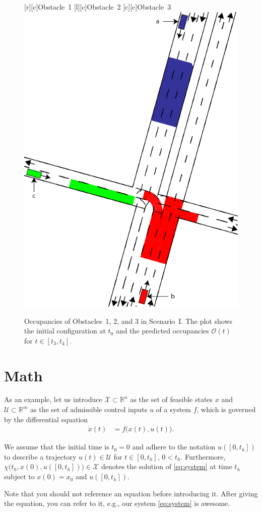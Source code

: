 \begin{figure}[!htpb]
	\centering
	\footnotesize
	[c]{Obstacle~1}
	[c]{Obstacle~2}
	[c]{Obstacle~3}
	\includegraphics[width=0.4\columnwidth]{./figures/Scenario_Intersection_Occ_1,5-2,0s_final}
	\caption{Occupancies of Obstacles~1, 2, and 3 in Scenario~I.
		The plot shows the initial configuration at $t_{0}$ and the predicted occupancies $\mathcal{O}(t)$ for ${t \in [t_{3}, t_{4}]}$.
	}
	\label{fig:scenario1}
\end{figure}

\section{Math}
As an example, let us introduce $\mathcal{X}\subset\mathbb{R}^n$ as the set of feasible states $x$ and $\mathcal{U}\subset\mathbb{R}^m$ as the set of admissible control inputs $u$ of a system $f$, which is governed by the differential equation
\begin{equation}
	\begin{split}
		\dot{x}(t) & = f\big(x(t),u(t)\big). %
	\end{split}
	\label{eq:system}
\end{equation}

We assume that the initial time is $t_0 = 0$ and adhere to the notation $u([0, t_h])$ to describe a trajectory $u(t)\in\mathcal{U}$ for $t\in
	[0,t_h]$, $0<t_h$.
Furthermore, $\chi\big(t_h,x(0),u([0,t_h])\big)\in\mathcal{X}$ denotes the solution of \eqref{eq:system} at time $t_h$ subject to $x(0)=x_0$ and
$u([0,t_h])$.

Note that you should not reference an equation before introducing it.
After giving the equation, you can refer to it, e.g., our system \eqref{eq:system} is awesome.

